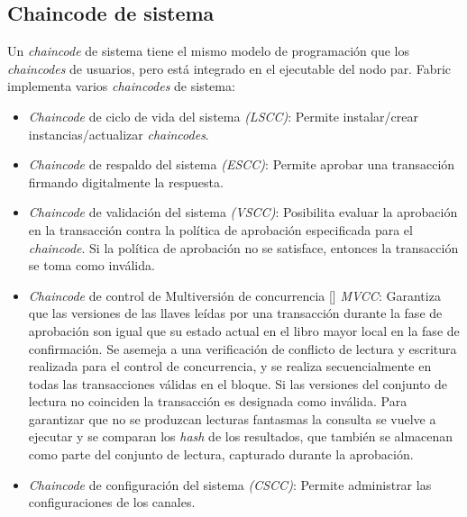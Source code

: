\subsection{Chaincode de sistema}
Un \emph{chaincode} de sistema tiene el mismo modelo de programaci\'on que los \emph{chaincodes} de usuarios, pero est\'a integrado en el ejecutable del nodo par. Fabric implementa varios \emph{chaincodes} de sistema:
\begin{itemize}
\item \emph{Chaincode} de ciclo de vida del sistema \emph{(LSCC)}: Permite instalar/crear instancias/actualizar \emph{chaincodes}.

\item \emph{Chaincode} de respaldo del sistema  \emph{(ESCC)}: Permite aprobar una transacci\'on firmando digitalmente la respuesta.

\item \emph{Chaincode} de validaci\'on del sistema \emph{(VSCC)}: Posibilita evaluar la aprobaci\'on en la transacci\'on contra la pol\'itica de aprobaci\'on especificada para el \emph{chaincode}. Si la pol\'itica de aprobaci\'on no se satisface, entonces la transacci\'on se toma como inv\'alida.

\item \emph{Chaincode} de control de Multiversi\'on de concurrencia [\cite{papadimitriou1984concurrency}] \emph{MVCC}: Garantiza que las versiones de las llaves le\'idas por una transacci\'on durante la fase de aprobaci\'on son igual que su estado actual en el libro mayor local en la fase de confirmaci\'on. Se asemeja a una verificaci\'on de conflicto de lectura y escritura realizada para el control de concurrencia, y se realiza secuencialmente en todas las transacciones v\'alidas en el bloque. Si las versiones del conjunto de lectura no coinciden la transacci\'on es designada como inv\'alida. Para garantizar que no se produzcan lecturas fantasmas la consulta se vuelve a ejecutar y se comparan los \emph{hash} de los resultados, que tambi\'en se almacenan como parte del conjunto de lectura, capturado durante la aprobaci\'on.

\item \emph{Chaincode} de configuraci\'on del sistema \emph{(CSCC)}: Permite administrar las configuraciones de los canales.
\end{itemize}


